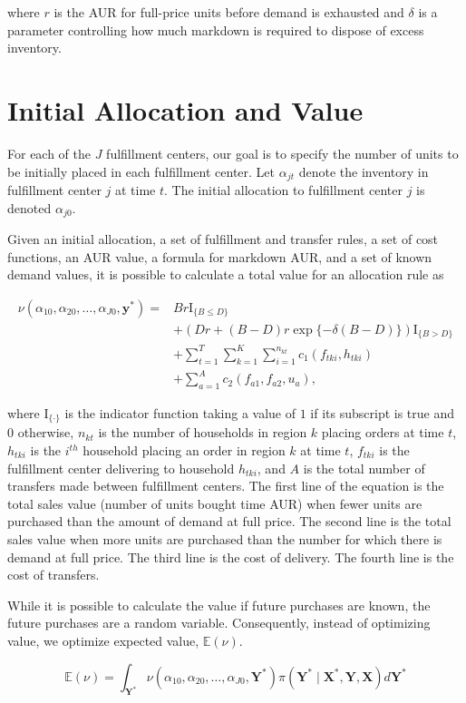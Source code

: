 \documentclass[11pt, oneside]{article}   	%
\begin{document}
\noindent where $r$ is the AUR for full-price units before demand is exhausted and $\delta$ is a parameter controlling how much markdown is required to dispose of excess inventory.

\section{Initial Allocation and Value}

For each of the $J$ fulfillment centers, our goal is to specify the number of units to be initially placed in each fulfillment center.  Let $\alpha_{jt}$ denote the inventory in fulfillment center $j$ at time $t$.  The initial allocation to fulfillment center $j$ is denoted $\alpha_{j0}$.

Given an initial allocation, a set of fulfillment and transfer rules, a set of cost functions, an AUR value, a formula for markdown AUR, and a set of known demand values, it is possible to calculate a total value for an allocation rule as

\begin{align*}
\nu(\alpha_{10}, \alpha_{20}, \ldots, \alpha_{J0}, \mathbf{y}^*) = &Br \mathrm{I}_{\{B \leq D\}} \\
&+ \left( Dr + (B - D) r \exp \{ - \delta (B - D) \} \right) \mathrm{I}_{ \{ B > D \} } \\
&+ \sum_{t = 1}^T \sum_{k = 1}^K \sum_{i = 1}^{n_{kt}} c_1 (f_{tki}, h_{tki}) \\
&+ \sum_{a = 1}^A c_2 (f_{a1}, f_{a2}, u_a),
\end{align*}

\noindent where $\mathrm{I}_{\{ \cdot \}}$ is the indicator function taking a value of $1$ if its subscript is true and $0$ otherwise, $n_{kt}$ is the number of households in region $k$ placing orders at time $t$, $h_{tki}$ is the $i^{th}$ household placing an order in region $k$ at time $t$, $f_{tki}$ is the fulfillment center delivering to household $h_{tki}$, and $A$ is the total number of transfers made between fulfillment centers.  The first line of the equation is the total sales value (number of units bought time AUR) when fewer units are purchased than the amount of demand at full price.  The second line is the total sales value when more units are purchased than the number for which there is demand at full price.  The third line is the cost of delivery.  The fourth line is the cost of transfers.

While it is possible to calculate the value if future purchases are known, the future purchases are a random variable.  Consequently, instead of optimizing value, we optimize expected value, $\mathbb{E}(\nu)$.

$$\mathbb{E}(\nu) = \int_{\mathbf{Y}^*} \nu(\alpha_{10}, \alpha_{20}, \ldots, \alpha_{J0}, \mathbf{Y}^*) \pi (\mathbf{Y}^* \mid \mathbf{X}^*, \mathbf{Y}, \mathbf{X}) d \mathbf{Y}^*$$
\end{document}
